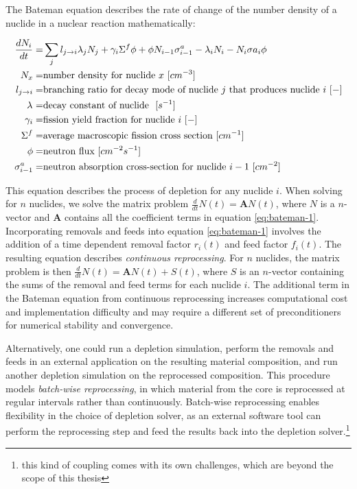 The Bateman equation describes the rate of change of the number density of a nuclide in a nuclear reaction mathematically:

\begin{align}
    \label{eq:bateman-1}
    \frac{dN_{i}}{dt} =& \sum_{j} l_{j\to i}\lambda_{j} N_{j} + \gamma_{i} \Sigma^{f}\phi + \phi N_{i-1} \sigma^{a}_{i-1} - \lambda_{i}N_{i} - N_{i}\sigma{a}_{i}\phi\\
    N_{x} =& \text{number density for nuclide $x$ $[cm^{-3}]$}\nonumber\\
    l_{j\to i} =& \text{branching ratio for decay mode of nuclide $j$ that produces nuclide $i$ $[-]$}\nonumber\\
    \lambda_{\*} =& \text{decay constant of nuclide $\*$ $[s^{-1}]$}\nonumber\\
    \gamma_{i} =& \text{fission yield fraction for nuclide $i$ $[-]$}\nonumber \\
    \Sigma^{f} =& \text{average macroscopic fission cross section $[cm^{-1}]$}\nonumber\\
    \phi =& \text{neutron flux $[cm^{-2}s^{-1}]$}\nonumber\\
    \sigma^{a}_{i-1} =& \text{neutron absorption cross-section for nuclide $i-1$ $[cm^{-2}]$}\nonumber\\
\end{align}
    
This equation describes the process of depletion for any nuclide
$i$. When solving for $n$ nuclides, we solve the matrix problem $\frac{d}{dt}N(t) =
\mathbf{A}N(t)$, where $N$ is a $n$-vector and $\mathbf{A}$ contains all the
coefficient terms in equation \ref{eq:bateman-1}. Incorporating removals and
feeds into equation \ref{eq:bateman-1} involves the addition of a time dependent removal
factor $r_{i}(t)$ and feed factor $f_{i}(t)$. The
resulting equation describes {\it continuous reprocessing}.  For $n$ nuclides,
the matrix problem is then $\frac{d}{dt}N(t) = \mathbf{A}N(t) + S(t)$, where $S$ is an
$n$-vector containing the sums of the removal and feed terms for each nuclide
$i$. The additional term in the Bateman equation from continuous reprocessing
increases computational cost and implementation difficulty and may require a
different set of preconditioners for numerical stability and convergence.

Alternatively, one could run a depletion simulation, perform the removals and
feeds in an external application on the resulting material composition, and run
another depletion simulation on the reprocessed composition. This procedure
models {\it batch-wise reprocessing}, in which material from the core is
reprocessed at regular intervals rather than continuously. Batch-wise
reprocessing enables flexibility in the choice of depletion solver, as an
external software tool can perform the reprocessing step and feed the results
back into the depletion solver.\footnote{this kind of coupling comes with its
own challenges, which are beyond the scope of this thesis}

